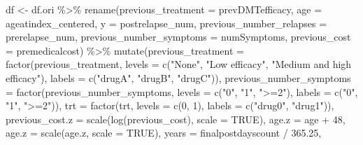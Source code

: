 \documentclass[
  letterpaper,
  DIV=11,
  numbers=noendperiod]{scrreprt}
\newenvironment{Shaded}{\begin{snugshade}}{\end{snugshade}}
\newcommand{\AttributeTok}[1]{\textcolor[rgb]{0.40,0.45,0.13}{#1}}
\newcommand{\ConstantTok}[1]{\textcolor[rgb]{0.56,0.35,0.01}{#1}}
\newcommand{\DecValTok}[1]{\textcolor[rgb]{0.68,0.00,0.00}{#1}}
\newcommand{\FloatTok}[1]{\textcolor[rgb]{0.68,0.00,0.00}{#1}}
\newcommand{\FunctionTok}[1]{\textcolor[rgb]{0.28,0.35,0.67}{#1}}
\newcommand{\NormalTok}[1]{\textcolor[rgb]{0.00,0.23,0.31}{#1}}
\newcommand{\OtherTok}[1]{\textcolor[rgb]{0.00,0.23,0.31}{#1}}
\newcommand{\SpecialCharTok}[1]{\textcolor[rgb]{0.37,0.37,0.37}{#1}}
\newcommand{\StringTok}[1]{\textcolor[rgb]{0.13,0.47,0.30}{#1}}
\begin{document}
\begin{Shaded}
\begin{Highlighting}[]
\NormalTok{df }\OtherTok{\textless{}{-}}\NormalTok{ df.ori }\SpecialCharTok{\%\textgreater{}\%}
  \FunctionTok{rename}\NormalTok{(}\AttributeTok{previous\_treatment =}\NormalTok{ prevDMTefficacy,}
         \AttributeTok{age =}\NormalTok{ ageatindex\_centered,}
         \AttributeTok{y =}\NormalTok{ postrelapse\_num,}
         \AttributeTok{previous\_number\_relapses =}\NormalTok{ prerelapse\_num,}
         \AttributeTok{previous\_number\_symptoms =}\NormalTok{ numSymptoms,}
         \AttributeTok{previous\_cost =}\NormalTok{ premedicalcost) }\SpecialCharTok{\%\textgreater{}\%}
  \FunctionTok{mutate}\NormalTok{(}\AttributeTok{previous\_treatment =} \FunctionTok{factor}\NormalTok{(previous\_treatment, }
                                     \AttributeTok{levels =} \FunctionTok{c}\NormalTok{(}\StringTok{"None"}\NormalTok{, }
                                                \StringTok{"Low efficacy"}\NormalTok{, }
                                                \StringTok{"Medium and high efficacy"}\NormalTok{), }
                                     \AttributeTok{labels =} \FunctionTok{c}\NormalTok{(}\StringTok{"drugA"}\NormalTok{, }\StringTok{"drugB"}\NormalTok{, }\StringTok{"drugC"}\NormalTok{)),}
         \AttributeTok{previous\_number\_symptoms =} \FunctionTok{factor}\NormalTok{(previous\_number\_symptoms, }
                                           \AttributeTok{levels =} \FunctionTok{c}\NormalTok{(}\StringTok{"0"}\NormalTok{, }\StringTok{"1"}\NormalTok{, }\StringTok{"\textgreater{}=2"}\NormalTok{), }
                                           \AttributeTok{labels =} \FunctionTok{c}\NormalTok{(}\StringTok{"0"}\NormalTok{, }\StringTok{"1"}\NormalTok{, }\StringTok{"\textgreater{}=2"}\NormalTok{)),}
         \AttributeTok{trt =} \FunctionTok{factor}\NormalTok{(trt, }\AttributeTok{levels =} \FunctionTok{c}\NormalTok{(}\DecValTok{0}\NormalTok{, }\DecValTok{1}\NormalTok{), }\AttributeTok{labels =} \FunctionTok{c}\NormalTok{(}\StringTok{"drug0"}\NormalTok{, }\StringTok{"drug1"}\NormalTok{)),}
         \AttributeTok{previous\_cost.z =} \FunctionTok{scale}\NormalTok{(}\FunctionTok{log}\NormalTok{(previous\_cost), }\AttributeTok{scale =} \ConstantTok{TRUE}\NormalTok{), }
         \AttributeTok{age.z =}\NormalTok{ age }\SpecialCharTok{+} \DecValTok{48}\NormalTok{,}
         \AttributeTok{age.z =} \FunctionTok{scale}\NormalTok{(age.z, }\AttributeTok{scale =} \ConstantTok{TRUE}\NormalTok{),}
         \AttributeTok{years =}\NormalTok{ finalpostdayscount }\SpecialCharTok{/} \FloatTok{365.25}\NormalTok{,}

\end{Highlighting}
\end{Shaded}
\end{document}
